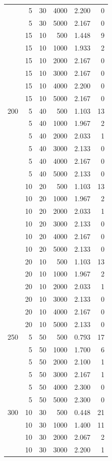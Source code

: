 \begin{longtable}{rrrrrr}
 & 5 & 30 & 4000 & 2.200 & 0 \\
 & 5 & 30 & 5000 & 2.167 & 0 \\
 & 15 & 10 & 500 & 1.448 & 9 \\
 & 15 & 10 & 1000 & 1.933 & 2 \\
 & 15 & 10 & 2000 & 2.167 & 0 \\
 & 15 & 10 & 3000 & 2.167 & 0 \\
 & 15 & 10 & 4000 & 2.200 & 0 \\
 & 15 & 10 & 5000 & 2.167 & 0 \\
\midrule
200 & 5 & 40 & 500 & 1.103 & 13 \\
 & 5 & 40 & 1000 & 1.967 & 2 \\
 & 5 & 40 & 2000 & 2.033 & 1 \\
 & 5 & 40 & 3000 & 2.133 & 0 \\
 & 5 & 40 & 4000 & 2.167 & 0 \\
 & 5 & 40 & 5000 & 2.133 & 0 \\
 & 10 & 20 & 500 & 1.103 & 13 \\
 & 10 & 20 & 1000 & 1.967 & 2 \\
 & 10 & 20 & 2000 & 2.033 & 1 \\
 & 10 & 20 & 3000 & 2.133 & 0 \\
 & 10 & 20 & 4000 & 2.167 & 0 \\
 & 10 & 20 & 5000 & 2.133 & 0 \\
 & 20 & 10 & 500 & 1.103 & 13 \\
 & 20 & 10 & 1000 & 1.967 & 2 \\
 & 20 & 10 & 2000 & 2.033 & 1 \\
 & 20 & 10 & 3000 & 2.133 & 0 \\
 & 20 & 10 & 4000 & 2.167 & 0 \\
 & 20 & 10 & 5000 & 2.133 & 0 \\
\midrule
250 & 5 & 50 & 500 & 0.793 & 17 \\
 & 5 & 50 & 1000 & 1.700 & 6 \\
 & 5 & 50 & 2000 & 2.100 & 1 \\
 & 5 & 50 & 3000 & 2.167 & 1 \\
 & 5 & 50 & 4000 & 2.300 & 0 \\
 & 5 & 50 & 5000 & 2.300 & 0 \\
\midrule
300 & 10 & 30 & 500 & 0.448 & 21 \\
 & 10 & 30 & 1000 & 1.400 & 11 \\
 & 10 & 30 & 2000 & 2.067 & 2 \\
 & 10 & 30 & 3000 & 2.200 & 1 \\

\end{longtable}
